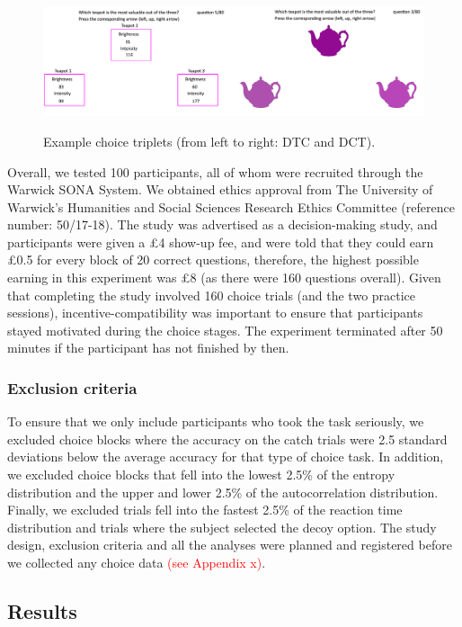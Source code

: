 \documentclass[11pt,a4paper]{article}
\begin{document}
\begin{figure}[htp!]
\centering
\caption{Example choice triplets (from left to right: DTC and DCT).}
\includegraphics[width=1\textwidth]{choice_triplets.png}
\label{fig:choicetriplets}
\end{figure}


Overall, we tested 100 participants, all of whom were recruited through the Warwick SONA System.  We obtained ethics approval from The University of Warwick’s Humanities and Social Sciences Research Ethics Committee (reference number: 50/17-18). The study was advertised as a decision-making study, and participants were given a £4 show-up fee, and were told that they could earn £0.5 for every block of 20 correct questions, therefore, the highest possible earning in this experiment was £8 (as there were 160 questions overall). Given that completing the study involved 160 choice trials (and the two practice sessions), incentive-compatibility was important to ensure that participants stayed motivated during the choice stages. The experiment terminated after 50 minutes if the participant has not finished by then. 


\subsubsection{Exclusion criteria}

To ensure that we only include participants who took the task seriously, we excluded choice blocks where the accuracy on the catch trials were 2.5 standard deviations below the average accuracy for that type of choice task. In addition, we excluded choice blocks that fell into the lowest 2.5\% of the entropy distribution
and the upper and lower 2.5\% of the autocorrelation distribution. Finally, we excluded trials fell into the fastest 2.5\% of
the reaction time distribution and trials where the subject selected the decoy option.
The study design, exclusion criteria and all the analyses were planned and
registered before we collected any choice data \textcolor{red}{(see Appendix x)}.

\subsection{Results}
\end{document}
